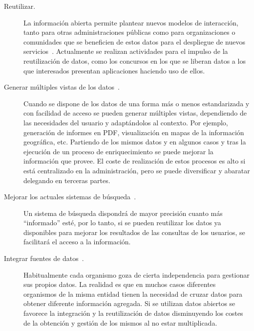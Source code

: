 \begin{description}
\item [Reutilizar.] La información abierta permite plantear nuevos modelos de interacción, tanto para otras administraciones públicas
como para organizaciones o comunidades que se beneficien de estos datos para el despliegue de nuevos servicios~\cite{web20}. Actualmente
se realizan actividades para el impulso de la reutilización de datos, como los concursos en los que se liberan datos a los que interesados
presentan aplicaciones haciendo uso de ellos.
 \item [Generar múltiples vistas de los datos~\cite{DBLP:journals/semweb/DadzieR11}.] Cuando se dispone de los datos de una forma más o menos estandarizada y con facilidad
de acceso se pueden generar múltiples vistas, dependiendo de las necesidades del usuario y adaptándolos al contexto. Por ejemplo,
generación de informes en PDF, visualización en mapas de la información geográfica, etc. Partiendo de los mismos datos y en algunos
casos y tras la ejecución de un proceso de enriquecimiento se puede mejorar la información que provee. El coste de realización de 
estos procesos es alto si está centralizado en la administración, pero se puede diversificar y abaratar delegando en 
terceras partes.
 \item [Mejorar los actuales sistemas de búsqueda~\cite{hoga-etal-2011-swse-JWS}.] Un sistema de búsqueda dispondrá de mayor precisión cuanto más ``informado'' esté, por lo tanto,
si se pueden reutilizar los datos ya disponibles para mejorar los resultados de las consultas de los usuarios, se facilitará el acceso a la
información.
  \item [Integrar fuentes de datos~\cite{Andreas_Schultz_Isele_Bizer_Becker_2011,Harth:2011:SIP:1963192.1963318}.] Habitualmente cada organismo goza de cierta independencia para gestionar sus propios datos. La realidad
es que en muchos casos diferentes organismos de la misma entidad tienen la necesidad de cruzar datos para obtener diferente información
agregada. Si se utilizan datos abiertos se favorece la integración y la reutilización de datos disminuyendo los costes de la obtención
y gestión de los mismos al no estar multiplicada.
\end{description}


